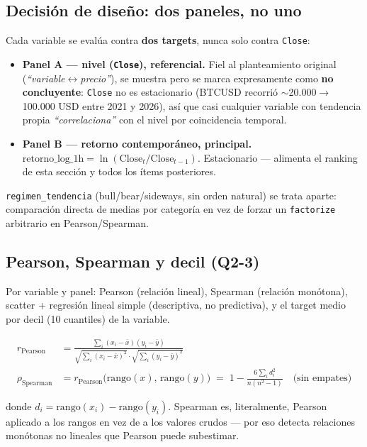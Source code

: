 \documentclass[11pt,a4paper]{article}
\newcommand{\code}[1]{\texttt{\small #1}}
\newcommand{\dq}[1]{\emph{``#1''}}
\begin{document}
\subsection{Decisión de diseño: dos paneles, no uno}
\label{ssec:dos-paneles}

Cada variable se evalúa contra \textbf{dos targets}, nunca solo contra \code{Close}:

\begin{itemize}[leftmargin=1.4em,itemsep=2pt]
\item \textbf{Panel A — nivel (\code{Close}), referencial.} Fiel al planteamiento
  original (\dq{variable$\leftrightarrow$precio}), se muestra pero se marca expresamente como
  \textbf{no concluyente}: \code{Close} no es estacionario (BTCUSD recorrió
  \(\sim\)20.000\(\to\)100.000 USD entre 2021 y 2026), así que casi cualquier variable con
  tendencia propia \dq{correlaciona} con el nivel por coincidencia temporal.
\item \textbf{Panel B — retorno contemporáneo, principal.}
  \(\text{retorno\_log\_1h} = \ln(\text{Close}_t / \text{Close}_{t-1})\). Estacionario —
  alimenta el ranking de esta sección y todos los ítems posteriores.
\end{itemize}

\code{regimen\_tendencia} (bull/bear/sideways, sin orden natural) se trata aparte:
comparación directa de medias por categoría en vez de forzar un \code{factorize}
arbitrario en Pearson/Spearman.

\subsection{Pearson, Spearman y decil (Q2-3)}

Por variable y panel: Pearson (relación lineal), Spearman (relación monótona), scatter +
regresión lineal simple (descriptiva, no predictiva), y el target medio por decil (10
cuantiles) de la variable.

\begin{align}
r_{\mathrm{Pearson}} &= \frac{\sum_i (x_i - \bar{x})(y_i - \bar{y})}
  {\sqrt{\sum_i (x_i-\bar{x})^2} \cdot \sqrt{\sum_i (y_i-\bar{y})^2}} \\
\rho_{\mathrm{Spearman}} &= r_{\mathrm{Pearson}}\big(\mathrm{rango}(x),\, \mathrm{rango}(y)
  \big) \;=\; 1 - \frac{6\sum_i d_i^2}{n(n^2-1)} \quad \text{(sin empates)}
\end{align}

donde \(d_i = \mathrm{rango}(x_i) - \mathrm{rango}(y_i)\). Spearman es, literalmente,
Pearson aplicado a los rangos en vez de a los valores crudos — por eso detecta relaciones
monótonas no lineales que Pearson puede subestimar.
\end{document}
